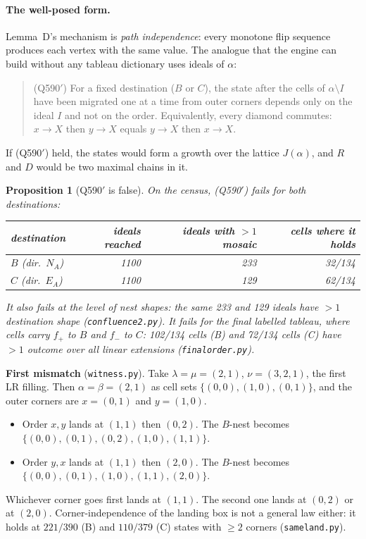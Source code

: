 \documentclass[11pt]{article}
\newtheorem{proposition}[theorem]{Proposition}
\theoremstyle{definition}
\begin{document}
\paragraph{The well-posed form.} Lemma~D's mechanism is \emph{path independence}: every monotone flip sequence produces each
vertex with the same value. The analogue that the engine can build without any tableau dictionary uses ideals of $\alpha$:
\begin{quote}
(Q590$'$) For a fixed destination ($B$ or $C$), the state after the cells of $\alpha\setminus I$ have been migrated one at a time
from outer corners depends only on the ideal $I$ and not on the order. Equivalently, every diamond commutes: $x\to X$ then
$y\to X$ equals $y\to X$ then $x\to X$.
\end{quote}
If (Q590$'$) held, the states would form a growth over the lattice $J(\alpha)$, and $R$ and $D$ would be two maximal chains in
it.

\begin{proposition}[Q590$'$ is false]\label{prop:refute}
On the census, (Q590$'$) fails for both destinations:
\begin{center}\begin{tabular}{lrrr}\toprule
destination & ideals reached & ideals with $>1$ mosaic & cells where it holds\\\midrule
$B$ (dir.\ $N_A$) & 1100 & 233 & 32/134\\
$C$ (dir.\ $E_A$) & 1100 & 129 & 62/134\\\bottomrule
\end{tabular}\end{center}
It also fails at the level of \emph{nest shapes}: the same 233 and 129 ideals have $>1$ destination shape
(\texttt{confluence2.py}). It fails for the \emph{final labelled tableau}, where cells carry $f_+$ to $B$ and $f_-$ to $C$:
102/134 cells (B) and 72/134 cells (C) have $>1$ outcome over all linear extensions (\texttt{finalorder.py}).
\end{proposition}
\textbf{First mismatch} (\texttt{witness.py}). Take $\lambda=\mu=(2,1)$, $\nu=(3,2,1)$, the first LR filling. Then
$\alpha=\beta=(2,1)$ as cell sets $\{(0,0),(1,0),(0,1)\}$, and the outer corners are $x=(0,1)$ and $y=(1,0)$.
\begin{itemize}
\item Order $x,y$ lands at $(1,1)$ then $(0,2)$. The $B$-nest becomes $\{(0,0),(0,1),(0,2),(1,0),(1,1)\}$.
\item Order $y,x$ lands at $(1,1)$ then $(2,0)$. The $B$-nest becomes $\{(0,0),(0,1),(1,0),(1,1),(2,0)\}$.
\end{itemize}
Whichever corner goes first lands at $(1,1)$. The second one lands at $(0,2)$ or at $(2,0)$. Corner-independence of the landing box
is not a general law either: it holds at $221/390$ (B) and $110/379$ (C) states with $\ge2$ corners (\texttt{sameland.py}).
\end{document}

